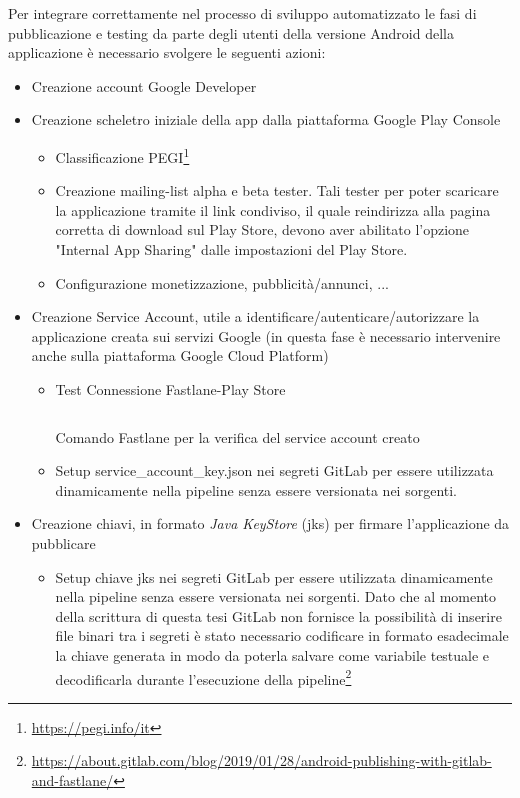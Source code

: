 Per integrare correttamente nel processo di sviluppo automatizzato le fasi di pubblicazione e testing da parte degli utenti della versione Android della applicazione è necessario svolgere le seguenti azioni:
\begin{itemize}
    \item Creazione account Google Developer
    \item Creazione scheletro iniziale della app dalla piattaforma Google Play Console
    \begin{itemize}
        \item Classificazione PEGI\footnote{\url{https://pegi.info/it}}
        \item Creazione mailing-list alpha e beta tester. Tali tester per poter scaricare la applicazione tramite il link condiviso, il quale reindirizza alla pagina corretta di download sul Play Store, devono aver abilitato l'opzione "Internal App Sharing" dalle impostazioni del Play Store.
        \item Configurazione monetizzazione, pubblicità/annunci, ...
    \end{itemize}
    \item Creazione Service Account, utile a identificare/autenticare/autorizzare la applicazione creata sui servizi Google (in questa fase è necessario intervenire anche sulla piattaforma Google Cloud Platform)
    \begin{itemize}
        \item Test Connessione Fastlane-Play Store
        \begin{listing}[H]
        \inputminted{bash}{code/4-testconnessionegpc}
        \caption{Comando Fastlane per la verifica del service account creato}
        \end{listing}
        \item Setup service\_account\_key.json nei segreti GitLab per essere utilizzata dinamicamente nella pipeline senza essere versionata nei sorgenti.
    \end{itemize}
    \item Creazione chiavi, in formato \textit{Java KeyStore} (jks) per firmare l'applicazione da pubblicare
    \begin{itemize}
        \item Setup chiave jks nei segreti GitLab per essere utilizzata dinamicamente nella pipeline senza essere versionata nei sorgenti. Dato che al momento della scrittura di questa tesi GitLab non fornisce la possibilità di inserire file binari tra i segreti è stato necessario codificare in formato esadecimale la chiave generata in modo da poterla salvare come variabile testuale e decodificarla durante l'esecuzione della pipeline\footnote{\url{https://about.gitlab.com/blog/2019/01/28/android-publishing-with-gitlab-and-fastlane/}}

\end{itemize}
\end{itemize}
